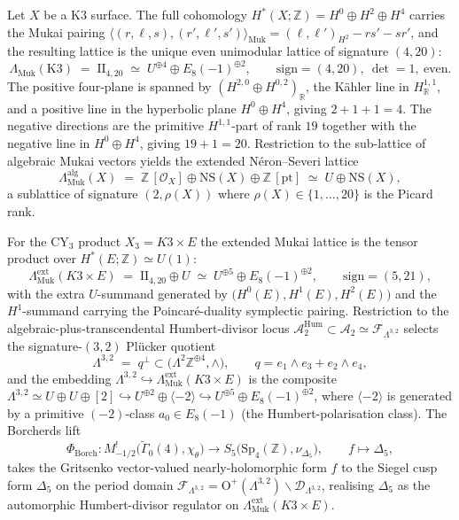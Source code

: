 \begin{proposition}
\label{prop:qgfnd-mukai-II420-extended-humbert}
Let $X$ be a K$3$ surface. The full cohomology
$H^*(X;\mathbb Z)=H^0\oplus H^2\oplus H^4$ carries the Mukai pairing
$\langle(r,\ell,s),(r',\ell',s')\rangle_{\mathrm{Muk}}=(\ell,\ell')_{H^2}-rs'-sr'$,
and the resulting lattice is the unique even unimodular lattice of
signature $(4,20)$:
\[
 \Lambda_{\mathrm{Muk}}(\mathrm{K3}) \;=\; \mathrm{II}_{4,20}
 \;\simeq\; U^{\oplus 4}\oplus E_8(-1)^{\oplus 2},
 \qquad\mathrm{sign}=(4,20),\ \det=1,\ \mathrm{even}.
\]
The positive four-plane is spanned by
\((H^{2,0}\oplus H^{0,2})_\mathbb R\), the K\"ahler line in
\(H^{1,1}_\mathbb R\), and a positive line in the hyperbolic plane
\(H^0\oplus H^4\), giving \(2+1+1=4\). The negative directions are the
primitive \(H^{1,1}\)-part of rank \(19\) together with the negative line
in \(H^0\oplus H^4\), giving \(19+1=20\). Restriction to the sub-lattice of algebraic Mukai vectors
yields the extended Néron--Severi lattice
\[
 \Lambda_{\mathrm{Muk}}^{\mathrm{alg}}(X)
 \;=\; \mathbb Z\,[\mathcal O_X]\oplus \mathrm{NS}(X)\oplus\mathbb Z\,[\mathrm{pt}]
 \;\simeq\; U\oplus\mathrm{NS}(X),
\]
a sublattice of signature $(2,\rho(X))$ where $\rho(X)\in\{1,\ldots,20\}$ is
the Picard rank.

For the CY$_3$ product $X_3=K3\times E$ the extended Mukai lattice is
the tensor product over $H^*(E;\mathbb Z)\simeq U(1)$:
\[
 \Lambda_{\mathrm{Muk}}^{\mathrm{ext}}(K3\times E)
 \;=\; \mathrm{II}_{4,20}\oplus U\;\simeq\; U^{\oplus 5}\oplus E_8(-1)^{\oplus 2},
 \qquad\mathrm{sign}=(5,21),
\]
with the extra $U$-summand generated by $\bigl(H^0(E),H^1(E),H^2(E)\bigr)$
and the $H^1$-summand carrying the Poincaré-duality symplectic pairing.
Restriction to the algebraic-plus-transcendental Humbert-divisor locus
$\mathcal A_2^{\mathrm{Hum}}\subset\mathcal A_2\simeq\mathcal F_{\Lambda^{3,2}}$
selects the signature-$(3,2)$ Pl\"ucker quotient
\[
 \Lambda^{3,2}\;=\;q^{\perp}\subset\bigl(\Lambda^2\mathbb Z^{\oplus 4},\wedge\bigr),
 \qquad q=e_1\wedge e_3+e_2\wedge e_4,
\]
and the embedding $\Lambda^{3,2}\hookrightarrow\Lambda_{\mathrm{Muk}}^{\mathrm{ext}}(K3\times E)$
is the composite
$\Lambda^{3,2}\simeq U\oplus U\oplus[2]\hookrightarrow U^{\oplus 2}\oplus
\langle-2\rangle\hookrightarrow U^{\oplus 5}\oplus E_8(-1)^{\oplus 2}$,
where $\langle-2\rangle$ is generated by a primitive $(-2)$-class
$a_0\in E_8(-1)$ (the Humbert-polarisation class). The Borcherds lift
\[
 \Phi_{\mathrm{Borch}}\colon M^{!}_{-1/2}\bigl(\widetilde{\Gamma}_0(4),\chi_{\theta}\bigr)
 \longrightarrow S_{5}\bigl(\mathrm{Sp}_4(\mathbb Z),\nu_{\Delta_5}\bigr),
 \qquad f\mapsto\Delta_5,
\]
takes the Gritsenko vector-valued nearly-holomorphic form $f$ to the
Siegel cusp form $\Delta_5$ on the period domain
$\mathcal F_{\Lambda^{3,2}}=\mathrm{O}^+(\Lambda^{3,2})\backslash
\mathcal D_{\Lambda^{3,2}}$, realising $\Delta_5$ as the automorphic
Humbert-divisor regulator on $\Lambda_{\mathrm{Muk}}^{\mathrm{ext}}(K3\times E)$.


\end{proposition}
